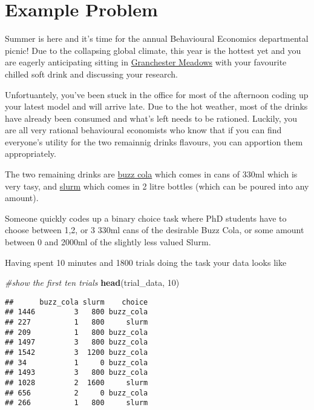 \documentclass[]{article}
\newenvironment{Shaded}{\begin{snugshade}}{\end{snugshade}}
\newcommand{\KeywordTok}[1]{\textcolor[rgb]{0.13,0.29,0.53}{\textbf{#1}}}
\newcommand{\DecValTok}[1]{\textcolor[rgb]{0.00,0.00,0.81}{#1}}
\newcommand{\CommentTok}[1]{\textcolor[rgb]{0.56,0.35,0.01}{\textit{#1}}}
\newcommand{\NormalTok}[1]{#1}
\begin{document}
\section{Example Problem}\label{example-problem}

Summer is here and it's time for the annual Behavioural Economics
departmental picnic! Due to the collapsing global climate, this year is
the hottest yet and you are eagerly anticipating sitting in
\href{https://en.wikipedia.org/wiki/Grantchester_Meadows}{Granchester
Meadows} with your favourite chilled soft drink and discussing your
research.

Unfortuantely, you've been stuck in the office for most of the afternoon
coding up your latest model and will arrive late. Due to the hot
weather, most of the drinks have already been consumed and what's left
needs to be rationed. Luckily, you are all very rational behavioural
economists who know that if you can find everyone's utility for the two
remainnig drinks flavours, you can apportion them appropriately.

The two remaining drinks are
\href{https://media2.giphy.com/media/3oriffxcqE2syOd5Ty/giphy.gif}{buzz
cola} which comes in cans of 330ml which is very tasy, and
\href{https://comb.io/qbzoUv.gif}{slurm} which comes in 2 litre bottles
(which can be poured into any amount).

Someone quickly codes up a binary choice task where PhD students have to
choose between 1,2, or 3 330ml cans of the desirable Buzz Cola, or some
amount between 0 and 2000ml of the slightly less valued Slurm.

Having spent 10 minutes and 1800 trials doing the task your data looks
like

\begin{Shaded}
\begin{Highlighting}[]
\CommentTok{#show the first ten trials}
\KeywordTok{head}\NormalTok{(trial_data, }\DecValTok{10}\NormalTok{)}
\end{Highlighting}
\end{Shaded}

\begin{verbatim}
##      buzz_cola slurm    choice
## 1446         3   800 buzz_cola
## 227          1   800     slurm
## 209          1   800 buzz_cola
## 1497         3   800 buzz_cola
## 1542         3  1200 buzz_cola
## 34           1     0 buzz_cola
## 1493         3   800 buzz_cola
## 1028         2  1600     slurm
## 656          2     0 buzz_cola
## 266          1   800     slurm
\end{verbatim}
\end{document}
